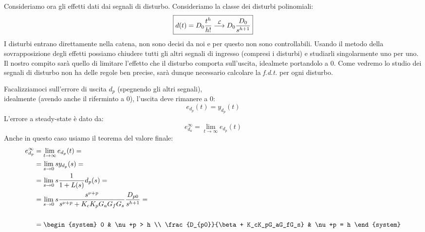 \documentclass[12pt]{article}
\begin{document}
Consideriamo ora gli effetti dati dai segnali di disturbo. Consideriamo la classe dei disturbi polinomiali:
\[ \boxed{ d(t) = D_0 \frac{t^{h}}{h!} \overset{\mathcal{L}}{\longrightarrow} D_0 \frac{D_0}{s^{h+1}} }  \]
I disturbi entrano direttamente nella catena, non sono decisi da noi e per questo non sono controllabili. Usando il metodo della sovrapposizione degli effetti possiamo chiudere tutti gli altri segnali di ingresso (compresi i disturbi) e studiarli singolarmente uno per  uno. Il nostro compito sar\`a quello di limitare l'effetto che il disturbo comporta sull'uscita, idealmete portandolo a 0. Come vedremo lo studio dei segnali di disturbo non ha delle regole ben precise, sar\`a dunque necessario calcolare la \emph{f.d.t.} per ogni disturbo.

Facalizziamoci sull'errore di uscita $d_p$ (spegnendo gli altri segnali), \\ idealmente (avendo anche il riferminto a 0), l'uscita deve rimanere a 0:
\[ e_{d_p}(t) = y_{d_p}(t) \]
L'errore a steady-state \`e dato da:
\[ e_{d_a}^{\infty} = \lim_{t \to \infty} e_{d_p}(t) \]
Anche in questo caso usiamo il teorema del valore finale:
\begin{align*}
    e_{d_p}^{\infty} &= \lim_{t \to \infty} e_{d_p}(t) = \\
    & = \lim_{s \to 0} sy _{d_p}(s) = \\
    & = \lim_{s \to 0} s\frac{1}{1+L(s)} d_p(s) = \\
    & = \lim_{s \to 0} s\frac{s^{\nu+p}}{s ^{\nu+p} + K_cK_pG_aG_fG_s} \frac{D_{p0}}{s^{h+1}} = \\
    \\
    & = \begin{system} 
        0 & \nu+p > h \\
        \frac{D_{p0}}{\beta + K_cK_pG_aG_fG_s} & \nu+p = h
    \end{system} 
\end{align*}
\end{document}
